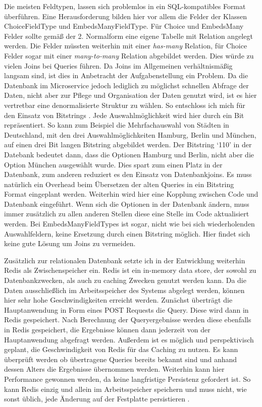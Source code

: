Die meisten Feldtypen, lassen sich problemlos in ein SQL-kompatibles Format überführen. 
Eine Herausforderung bilden hier vor allem die Felder der Klassen ChoiceFieldType und EmbedsManyFieldType. Für Choice und EmbedsMany Felder sollte gemäß der 2. Normalform \cite{db:normalform} eine eigene Tabelle mit Relation angelegt werden. Die  Felder müssten weiterhin mit einer \textit{has-many} Relation, für Choice Felder sogar mit einer \textit{many-to-many} Relation abgebildet werden. Dies würde zu vielen Joins bei Queries führen. Da Joins im Allgemeinen verhältnismäßig langsam sind, ist dies in Anbetracht der Aufgabenstellung ein Problem. Da die Datenbank im Microservice jedoch lediglich zu möglichst schnellen Abfrage der Daten, nicht aber zur Pflege und Organisation der Daten genutzt wird, ist es hier vertretbar eine denormalisierte Struktur zu wählen. So entschloss ich mich für den Einsatz von Bitstrings \cite{postgres:bitstring}. Jede Auswahlmöglichkeit wird hier durch ein Bit repräsentiert. So kann zum Beispiel die Mehrfachauswahl von Städten in Deutschland, mit den drei Auswahlmöglichkeiten Hamburg, Berlin und München, auf einen drei Bit langen Bitstring abgebildet werden. Der Bitstring `110' in der Datebank bedeutet dann, dass die Optionen Hamburg und Berlin, nicht aber die Option München ausgewählt wurde. Dies spart zum einen Platz in der Datenbank, zum anderen reduziert es den Einsatz von Datenbankjoins. Es muss natürlich ein Overhead beim Übersetzen der alten Queries in ein Bitstring Format eingeplant werden. Weiterhin wird hier eine Kopplung zwischen Code und Datenbank eingeführt. Wenn sich die Optionen in der Datenbank ändern, muss immer zusätzlich zu allen anderen Stellen diese eine Stelle im Code aktualisiert werden.
Bei EmbedsManyFieldTypes ist sogar, nicht wie bei sich wiederholenden Auswahlfeldern, keine Ersetzung durch einen Bitstring möglich. Hier findet sich keine gute Lösung um Joins zu vermeiden.


Zusätzlich zur relationalen Datenbank setzte ich in der Entwicklung weiterhin Redis\cite{redis} als Zwischenspeicher ein. Redis ist ein in-memory data store, der sowohl zu Datenbankzwecken, als auch zu caching Zwecken genutzt werden kann. Da die Daten ausschließlich im Arbeitsspeicher des Systems abgelegt werden, können hier sehr hohe Geschwindigkeiten erreicht werden.
Zunächst überträgt die Hauptanwendung in Form eines POST Requests die Query. Diese wird dann in Redis gespeichert. Nach Berechnung der Queryergebnisse werden diese ebenfalls in Redis gespeichert, die Ergebnisse können dann jederzeit von der Hauptanwendung abgefragt werden. Außerdem ist es möglich und perspektivisch geplant, die Geschwindigkeit von Redis für das Caching zu nutzen. Es kann überprüft werden ob übertragene Queries bereits bekannt sind und anhand dessen Alters die Ergebnisse übernommen werden. Weiterhin kann hier Performance gewonnen werden, da keine langfristige Persistenz gefordert ist. So kann Redis einzig und allein im Arbeitsspeicher speichern und muss nicht, wie sonst üblich, jede Änderung auf der Festplatte persistieren \cite{redis:faq}.

